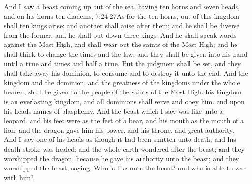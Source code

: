 \zz And I saw a beast coming up out of the sea, having ten horns and seven heads, and on his horns ten diadems,%
					   {7:24-27}{As for the ten horns, out of this kingdom shall ten kings arise: and another shall arise after them; and he shall be diverse from the former, and he shall put down three kings. And he shall speak words against the Most High, and shall wear out the saints of the Most High; and he shall think to change the times and the law; and they shall be given into his hand until a time and times and half a time. But the judgment shall be set, and they shall take away his dominion, to consume and to destroy it unto the end. And the kingdom and the dominion, and the greatness of the kingdoms under the whole heaven, shall be given to the people of the saints of the Most High: his kingdom is an everlasting kingdom, and all dominions shall serve and obey him.} %
and upon his heads names of blasphemy. 
And the beast which I saw was like unto a leopard, and his feet were as the feet of a bear, and his mouth as the mouth of a lion: and the dragon gave him his power, and his throne, and great authority. 
And I saw one of his heads as though it had been smitten unto death; and his death-stroke was healed: and the whole earth wondered after the beast; 
and they worshipped the dragon, because he gave his authority unto the beast; and they worshipped the beast, saying, Who is like unto the beast?%
and who is able to war with him? 
